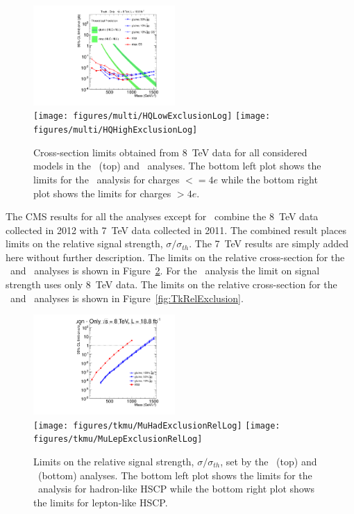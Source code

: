 \begin{figure}
\centering
  \includegraphics[clip=false, trim=0.0cm 0cm 0.0cm 0cm, width=0.48\textwidth]{figures/tkonly/TkExclusionLog} \\
  \texttt{[image: figures/multi/HQLowExclusionLog]}
  \texttt{[image: figures/multi/HQHighExclusionLog]}
\caption[Cross-section limits obtained from 8~TeV data for all considered models in the \tkonly\ and \multi\ analyses]
{Cross-section limits obtained from 8~TeV data for all considered models in the \tkonly\ (top) and \multi\ analyses.
The bottom left plot shows the limits for the \multi\ analysis for charges $<= 4e$ while the bottom right plot shows the limits for charges $> 4e$.
}
    \label{fig:TkExclusion}
\end{figure}

The CMS results for all the analyses except for \muononly\ combine the 8~TeV data collected in 2012 with 7~TeV data collected in 2011.
The combined result places limits on
the relative signal strength, $\sigma/\sigma_{th}$. The 7~TeV results are simply added here without further description.
The limits on the relative cross-section
for the \muononly\ and \tktof\ analyses is shown in Figure~\ref{fig:MuRelExclusion}. For the \muononly\ analysis the limit on signal strength uses only 8~TeV data.
The limits on the relative cross-section for the \tkonly\ and \multi\ analyses is shown in Figure~\ref{fig:TkRelExclusion}.

\begin{figure}
\centering
  \includegraphics[clip=false, trim=0.0cm 0cm 0.0cm 0cm, width=0.48\textwidth]{figures/muonly/MOExclusionRelLog} \\
  \texttt{[image: figures/tkmu/MuHadExclusionRelLog]}
  \texttt{[image: figures/tkmu/MuLepExclusionRelLog]} \\
\caption[Limits on the relative signal strength, $\sigma/\sigma_{th}$, set by the \muononly\ and \tktof\ analyses]
{Limits on the relative signal strength, $\sigma/\sigma_{th}$,  set by the \muononly\ (top) and \tktof\ (bottom) analyses.
The bottom left plot shows the limits for the \tktof\ analysis for hadron-like HSCP while the bottom right plot shows the limits for lepton-like HSCP.
}
    \label{fig:MuRelExclusion}
\end{figure}

